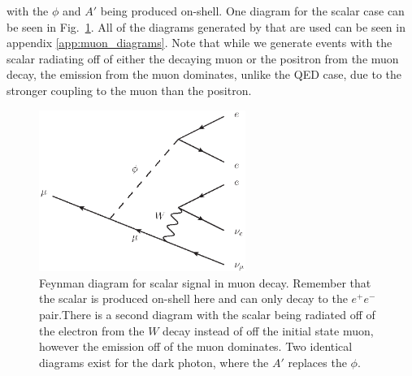 \noindent with the $\phi$ and $A'$ being produced on-shell.
One diagram for the scalar case can be seen in Fig.\ \ref{fig:mu_eeenunu_scalar}.
All of the diagrams generated by \madgraph that are used can be seen in appendix \ref{app:muon_diagrams}.
Note that while we generate events with the scalar radiating off of either the decaying muon or the positron from the muon decay, the emission from the muon dominates, unlike the QED case, due to the stronger coupling to the muon than the positron.

\begin{figure}[h]
    \centering
    \includegraphics[width=0.6\textwidth]{Figures/feynman_diagrams/mu_eeenunu_scalar}
    \caption{Feynman diagram for scalar signal in muon decay. Remember that the scalar is produced on-shell here and can only decay to the $e^+ e^-$ pair.There is a second diagram with the scalar being radiated off of the electron from the $W$ decay instead of off the initial state muon, however the emission off of the muon dominates. Two identical diagrams exist for the dark photon, where the $A'$ replaces the $\phi$.}
    \label{fig:mu_eeenunu_scalar}
\end{figure}

